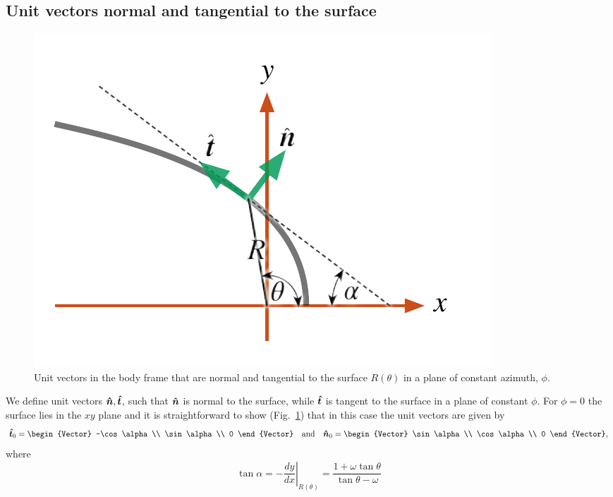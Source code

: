 \subsection{Unit vectors normal and tangential to the surface}
\label{sec:unit-vectors-normal}
\begin{figure}
  \centering
  \includegraphics[width=\linewidth]{figs/bowshock-unit-vectors}
  \caption{Unit vectors in the body frame that are normal and
    tangential to the surface \(R(\theta)\) in a plane of constant
    azimuth, \(\phi\).}
  \label{fig:unitvec}
\end{figure}
We define unit vectors \(\bm{\hat{n}}, \bm{\hat{t}}\), such that \(\bm{\hat{n}}\) is normal to the surface, while \(\bm{\hat{t}}\) is tangent to the surface in a plane of constant \(\phi\). For \(\phi = 0\) the surface lies in the \(xy\) plane and it is straightforward to show (Fig.~\ref{fig:unitvec}) that in this case the unit vectors are given by 
\begin{equation}
  \label{eq:uvec-phi0}
  \uvec{t}_0 =
  \begin{Vector}
    -\cos\alpha \\ \sin\alpha \\ 0
  \end{Vector}
  \quad \mathrm{and} \quad
  \uvec{n}_0 =
  \begin{Vector}
    \sin\alpha \\ \cos\alpha \\ 0
  \end{Vector}, 
\end{equation}
where
\begin{equation}
  \label{eq:alpha}
  \tan\alpha = -\left.\frac{dy}{dx}\right\vert_{R(\theta)} 
  = \frac{1 + \omega \tan\theta}{\tan\theta - \omega}
\end{equation}
